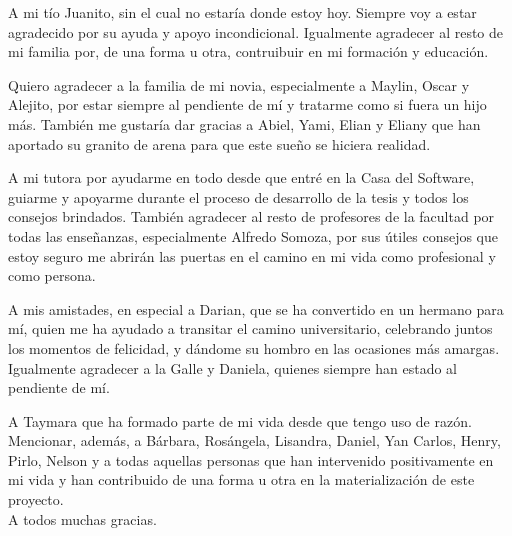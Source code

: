 A mi t\'io Juanito, sin el cual no estar\'ia donde estoy hoy. Siempre voy a estar agradecido por su ayuda y apoyo incondicional. Igualmente agradecer al resto de mi familia por, de una forma u otra, contruibuir en mi formaci\'on y educaci\'on.

Quiero agradecer a la familia de mi novia, especialmente a Maylin, Oscar y Alejito, por estar siempre al pendiente de m\'i y tratarme como si fuera un hijo m\'as. Tambi\'en me gustar\'ia dar gracias a Abiel, Yami, Elian y Eliany que han aportado su granito de arena para que este sue\~no se hiciera realidad.

A mi tutora por ayudarme en todo desde que entr\'e en la Casa del Software, guiarme y apoyarme durante el proceso de desarrollo de la tesis y todos los consejos brindados. Tambi\'en agradecer al resto de profesores de la facultad por todas las ense\~nanzas, especialmente Alfredo Somoza, por sus \'utiles consejos que estoy seguro me abrir\'an las puertas en el camino en mi vida como profesional y como persona. 

A mis amistades, en especial a Darian, que se ha convertido en un hermano para m\'i, quien me ha ayudado a transitar el camino universitario, celebrando juntos los momentos de felicidad, y d\'andome su hombro en las ocasiones m\'as amargas. Igualmente agradecer a la Galle y Daniela, quienes siempre han estado al pendiente de m\'i. 

A Taymara que ha formado parte de mi vida desde que tengo uso de raz\'on. Mencionar, adem\'as, a B\'arbara, Ros\'angela, Lisandra, Daniel, Yan Carlos, Henry, Pirlo, Nelson y a todas aquellas personas que han intervenido positivamente en mi vida y han contribuido de una forma u otra en la materializaci\'on de este proyecto.\\

A todos muchas gracias.






